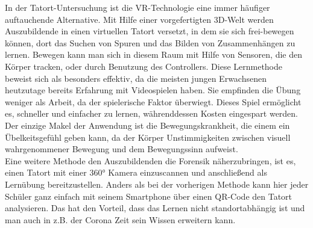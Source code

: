In der Tatort-Untersuchung ist die VR-Technologie eine immer häufiger auftauchende Alternative. Mit Hilfe einer vorgefertigten 3D-Welt werden Auszubildende in einen virtuellen Tatort versetzt, in dem sie sich frei-bewegen können, dort das Suchen von Spuren und das Bilden von Zusammenhängen zu lernen. Bewegen kann man sich in diesem Raum mit Hilfe von Sensoren, die den Körper tracken, oder durch Benutzung des Controllers. Diese Lernmethode beweist sich als besonders effektiv, da die meisten jungen Erwachsenen heutzutage bereits Erfahrung mit Videospielen haben. Sie empfinden die Übung weniger als Arbeit, da der spielerische Faktor überwiegt. Dieses Spiel ermöglicht es, schneller und einfacher zu lernen, währenddessen Kosten eingespart werden. Der einzige Makel der Anwendung ist die Bewegungskrankheit, die einem ein Übelkeitsgefühl geben kann, da der Körper Unstimmigkeiten zwischen visuell wahrgenommener Bewegung und dem Bewegungssinn aufweist. \cite{mayne2020virtual}
\\
Eine weitere Methode den Auszubildenden die Forensik näherzubringen, ist es, einen Tatort mit einer 360° Kamera einzuscannen und anschließend als Lernübung bereitzustellen. Anders als bei der vorherigen Methode kann hier jeder Schüler ganz einfach mit seinem Smartphone über einen QR-Code den Tatort analysieren. Das hat den Vorteil, dass das Lernen nicht standortabhängig ist und man auch in z.B. der Corona Zeit sein Wissen erweitern kann. \cite{kader2020building}
